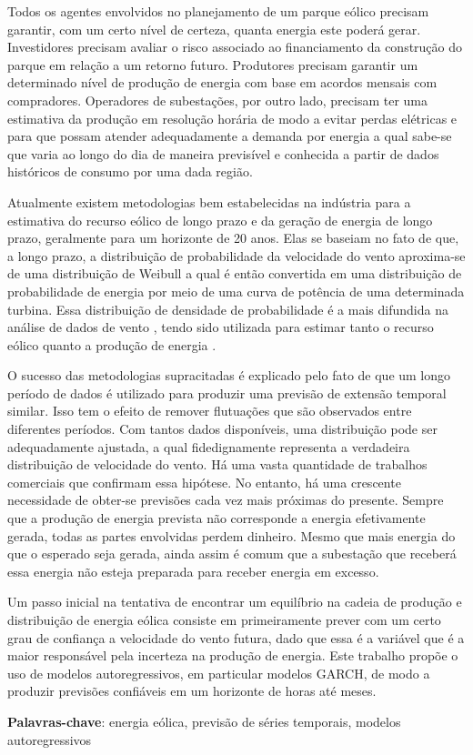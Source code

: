 \documentclass[
	12pt,				%
	openright,			%
	oneside,			%
	a4paper,			%
	english,			%
	french,				%
	spanish,			%
	brazil				%
	]{abntex2}
\begin{document}
\setlength{\absparsep}{18pt} %
\begin{resumo}
Todos os agentes envolvidos no planejamento de um parque eólico precisam garantir, com um certo nível de certeza, quanta energia este poderá gerar. Investidores precisam avaliar o risco associado ao financiamento da construção do parque em relação a um retorno futuro. Produtores precisam garantir um determinado nível de produção de energia com base em acordos mensais com compradores. Operadores de subestações, por outro lado, precisam ter uma estimativa da produção em resolução horária de modo a evitar perdas elétricas e para que possam atender adequadamente a demanda por energia a qual sabe-se que varia ao longo do dia de maneira previsível e conhecida a partir de dados históricos de consumo por uma dada região.

Atualmente existem metodologias bem estabelecidas na indústria para a estimativa do recurso eólico de longo prazo e da geração de energia de longo prazo, geralmente para um horizonte de 20 anos. Elas se baseiam no fato de que, a longo prazo, a distribuição de probabilidade da velocidade do vento aproxima-se de uma distribuição de Weibull \cite{weibull} a qual é então convertida em uma distribuição de probabilidade de energia por meio de uma curva de potência de uma determinada turbina. Essa distribuição de densidade de probabilidade é a mais difundida na análise de dados de vento \cite{art13},  tendo sido utilizada para estimar tanto o recurso eólico \cite{art14} quanto a produção de energia \cite{art15}.

O sucesso das metodologias supracitadas é explicado pelo fato de que um longo período de dados é utilizado para produzir uma previsão de extensão temporal similar. Isso tem o efeito de remover flutuações que são observados entre diferentes períodos. Com tantos dados disponíveis, uma distribuição pode ser adequadamente ajustada, a qual fidedignamente representa a verdadeira distribuição de velocidade do vento. Há uma vasta quantidade de trabalhos comerciais que confirmam essa hipótese. No entanto, há uma crescente necessidade de obter-se previsões cada vez mais próximas do presente. Sempre que a produção de energia prevista não corresponde a energia efetivamente gerada, todas as partes envolvidas perdem dinheiro. Mesmo que mais energia do que o esperado seja gerada, ainda assim é comum que a subestação que receberá essa energia não esteja preparada para receber energia em excesso.


Um passo inicial na tentativa de encontrar um equilíbrio na cadeia de produção e distribuição de energia eólica consiste em primeiramente prever com um certo grau de confiança a velocidade do vento futura, dado que essa é a variável que é a maior responsável pela incerteza na produção de energia. Este trabalho propõe o uso de modelos autoregressivos, em particular modelos GARCH, de modo a produzir previsões confiáveis em um horizonte de horas até meses.

 \textbf{Palavras-chave}: energia eólica, previsão de séries temporais, modelos autoregressivos
\end{resumo}
\end{document}
